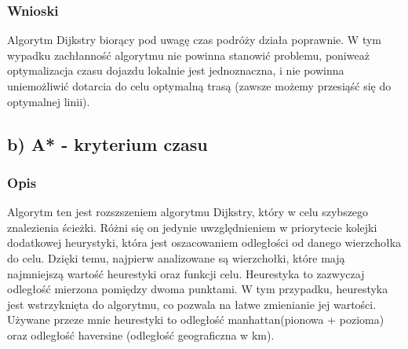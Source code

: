 \documentclass[a4paper, 12pt]{article}
\begin{document}
  \subsubsection{Wnioski} Algorytm Dijkstry biorący pod uwagę czas podróży działa poprawnie.
  W tym wypadku zachłanność algorytmu nie powinna stanowić problemu, poniweaż 
  optymalizacja czasu dojazdu lokalnie jest jednoznaczna, i nie powinna uniemożliwić dotarcia do celu 
  optymalną trasą (zawsze możemy przesiąść się do optymalnej linii).

  \subsection{b) A* - kryterium czasu}

  \subsubsection{Opis}
  Algorytm ten jest rozszszeniem algorytmu Dijkstry, który w celu szybszego znalezienia 
  ścieżki. Różni się on jedynie uwzględnieniem w priorytecie kolejki dodatkowej heurystyki,
  która jest oszacowaniem odległości od danego wierzchołka do celu. Dzięki temu, najpierw analizowane 
  są wierzchołki, które mają najmniejszą wartość heurestyki oraz funkcji celu.
  Heurestyka to zazwyczaj odległość mierzona pomiędzy dwoma punktami. W tym przypadku,
  heurestyka jest wstrzyknięta do algorytmu, co pozwala na łatwe zmienianie jej wartości.
  Używane przeze mnie heurestyki to odległość manhattan(pionowa + pozioma) oraz odległość haversine
  (odległość geograficzna w km).
\end{document}
